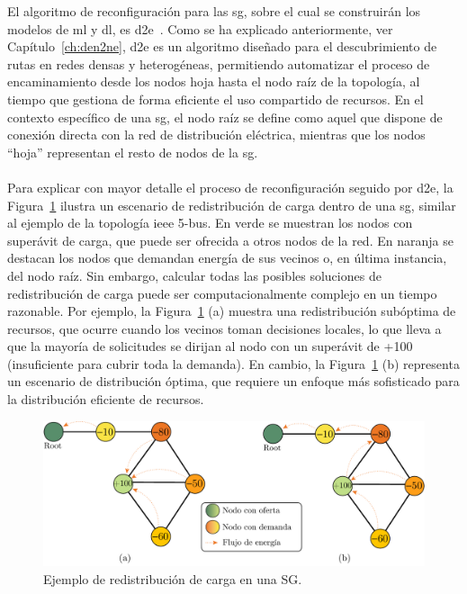 El algoritmo de reconfiguración para las \gls{sg}, sobre el cual se construirán los modelos de \gls{ml} y \gls{dl}, es \gls{d2e}~\cite{carrascal2024topology}. Como se ha explicado anteriormente, ver Capítulo~\ref{ch:den2ne}, \gls{d2e} es un algoritmo diseñado para el descubrimiento de rutas en redes densas y heterogéneas, permitiendo automatizar el proceso de encaminamiento desde los nodos hoja hasta el nodo raíz de la topología, al tiempo que gestiona de forma eficiente el uso compartido de recursos. En el contexto específico de una \gls{sg}, el nodo raíz se define como aquel que dispone de conexión directa con la red de distribución eléctrica, mientras que los nodos ``hoja'' representan el resto de nodos de la \gls{sg}. \\
\\
Para explicar con mayor detalle el proceso de reconfiguración seguido por \gls{d2e}, la Figura~\ref{fig:load_power_balancing} ilustra un escenario de redistribución de carga dentro de una \gls{sg}, similar al ejemplo de la topología \gls{ieee} 5-bus. En verde se muestran los nodos con superávit de carga, que puede ser ofrecida a otros nodos de la red. En naranja se destacan los nodos que demandan energía de sus vecinos o, en última instancia, del nodo raíz. Sin embargo, calcular todas las posibles soluciones de redistribución de carga puede ser computacionalmente complejo en un tiempo razonable. Por ejemplo, la Figura~\ref{fig:load_power_balancing} (a) muestra una redistribución subóptima de recursos, que ocurre cuando los vecinos toman decisiones locales, lo que lleva a que la mayoría de solicitudes se dirijan al nodo con un superávit de +100 (insuficiente para cubrir toda la demanda). En cambio, la Figura~\ref{fig:load_power_balancing} (b) representa un escenario de distribución óptima, que requiere un enfoque más sofisticado para la distribución eficiente de recursos.


\begin{figure}[H]
    \centering
    \includegraphics[width=0.9\linewidth]{fig/06_fault_sg/fault_sg_06.pdf}
    \caption{Ejemplo de redistribución de carga en una SG.}
    \label{fig:load_power_balancing}
\end{figure}

